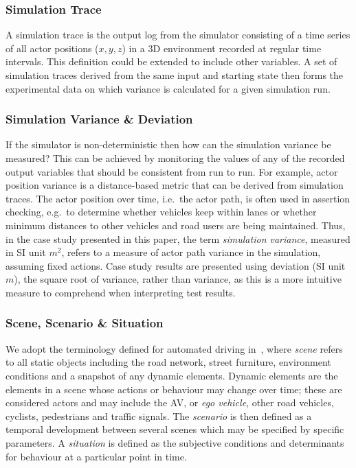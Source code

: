 \subsubsection{Simulation Trace}
A simulation trace is the output log from the simulator consisting of a time series of all actor positions ($x,y,z$) in a 3D environment recorded at regular time intervals. This definition could be extended to include other variables. A set of simulation traces derived from the same input and starting state then forms the experimental data on which variance is calculated for a given simulation run. \\

\subsubsection{Simulation Variance \& Deviation}
If the simulator is non-deterministic then how can the simulation variance be measured? This can be achieved by monitoring the values of any of the recorded output variables that should be consistent from run to run. For example, actor position variance is a distance-based metric that can be derived from simulation traces. The actor position over time, i.e.\ the actor path, is often used in assertion checking, e.g.\ to determine whether vehicles keep within lanes or whether minimum distances to other vehicles and road users are being maintained. 
% 
Thus, in the case study presented in this paper, the term \textit{simulation variance}, measured in SI unit $m^2$, refers to a measure of actor path variance in the simulation, assuming fixed actions. Case study results are presented using deviation (SI unit $m$), the square root of variance, rather than variance, as this is a more intuitive measure to comprehend when interpreting test results.
\\

\subsubsection{Scene, Scenario \& Situation}
We adopt the terminology defined for automated driving in~\cite{Ulbrich2015}, where \textit{scene} refers to all static objects including the road network, street furniture, environment conditions and a snapshot of any dynamic elements. Dynamic elements are the elements in a scene whose actions or behaviour may change over time; these are considered actors and may include the AV, or \textit{ego vehicle}, other road vehicles, cyclists, pedestrians and traffic signals. The \textit{scenario} is then defined as a temporal development between several scenes which may be specified by specific parameters. A \textit{situation} is defined as the subjective conditions and determinants for behaviour at a particular point in time.

